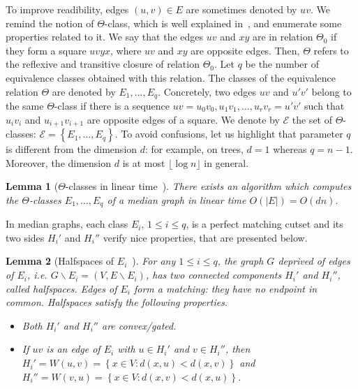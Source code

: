 \documentclass{article}
\newtheorem{lemma}{Lemma}
\newcommand{\set}[1]{\left\{ #1 \right\}}
\newcommand{\card}[1]{\left| #1 \right|}
\begin{document}
To improve readibility, edges $(u,v) \in E$ are sometimes denoted by $uv$. We remind the notion of $\Theta$-class, which is well explained in~\cite{BeChChVa20}, and enumerate some properties related to it. We say that the edges $uv$ and $xy$ are in relation $\Theta_0$ if they form a square $uvyx$, where $uv$ and $xy$ are opposite edges. Then, $\Theta$ refers to the reflexive and transitive closure of relation $\Theta_0$. Let $q$ be the number of equivalence classes obtained with this relation. The classes of the equivalence relation $\Theta$ are denoted by $E_1,\ldots,E_q$. Concretely, two edges $uv$ and $u'v'$ belong to the same $\Theta$-class if there is a sequence $uv = u_0v_0, u_1v_1, \ldots, u_rv_r= u'v'$ such that $u_iv_i$ and $u_{i+1}v_{i+1}$ are opposite edges of a square. We denote by $\mathcal{E}$ the set of $\Theta$-classes: $\mathcal{E} = \set{E_1,\ldots,E_q}$. To avoid confusions, let us highlight that parameter $q$ is different from the dimension $d$: for example, on trees, $d=1$ whereas $q = n-1$. Moreover, the dimension $d$ is at most $\lfloor \log n \rfloor$ in general.

\begin{lemma}[$\Theta$-classes in linear time~\cite{BeChChVa20}]
There exists an algorithm which computes the $\Theta$-classes $E_1,\ldots,E_q$ of a median graph in linear time $O(\card{E}) = O(dn)$.
\label{le:linear_classes}
\end{lemma}

In median graphs, each class $E_i$, $1\le i\le q$, is a perfect matching cutset and its two sides $H_i'$ and $H_i''$ verify nice properties, that are presented below.

\begin{lemma}[Halfspaces of $E_i$~\cite{BeChChVa20,HaImKl99,Mu80}]
For any $1\le i\le q$, the graph $G$ deprived of edges of $E_i$, {\em i.e.} $G\backslash E_i = (V,E\backslash E_i)$, has two connected components $H_i'$ and $H_i''$, called \textit{halfspaces}. Edges of $E_i$ form a matching: they have no endpoint in common. Halfspaces satisfy the following properties.
\begin{itemize}
\item Both $H_i'$ and $H_i''$ are convex/gated.
\item If $uv$ is an edge of $E_i$ with $u \in H_i'$ and $v \in H_i''$, then $H_i' = W(u,v) = \set{x \in V: d(x,u) < d(x,v)}$ and $H_i'' = W(v,u) = \set{x \in V: d(x,v) < d(x,u)}$.
\end{itemize}
\label{le:halfspaces}
\end{lemma}
\end{document}
